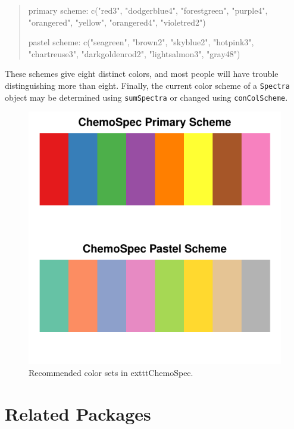 \documentclass[letter,10pt,twocolumn,twoside,printwatermark=false]{pinp}
\begin{document}
\begin{quote}
primary scheme: c("red3", "dodgerblue4", "forestgreen", "purple4", "orangered", "yellow", "orangered4", "violetred2")

pastel scheme: c("seagreen", "brown2", "skyblue2", "hotpink3", "chartreuse3", "darkgoldenrod2", "lightsalmon3", "gray48")
\end{quote}

These schemes give eight distinct colors, and most people will have
trouble distinguishing more than eight. Finally, the current color
scheme of a \texttt{Spectra} object may be determined using
\texttt{sumSpectra} or changed using \texttt{conColScheme}.

\begin{figure}

{\centering \includegraphics{ChemoSpec2_files/figure-latex/Chunk4-1} 

}

\caption{\label{colors}Recommended color sets in    exttt{ChemoSpec}.}\label{fig:Chunk4}
\end{figure}

\hypertarget{related-packages}{%
\section{Related Packages}\label{related-packages}}
\end{document}
